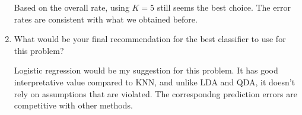 \documentclass[11pt]{article}
\begin{document}
\begin{enumerate}
    Based on the overall rate, using $K=5$ still seems the best choice.  The  error rates are consistent with what we obtained before.
    
  \item What would be your final recommendation for the best classifier to use for this problem?

     Logistic regression would be my suggestion for this problem. It has good interpretative value compared to KNN, and unlike LDA and QDA, it doesn't rely on assumptions that are violated. The correspondng prediction errors are competitive with other methods.
\end{enumerate}
\end{document}
